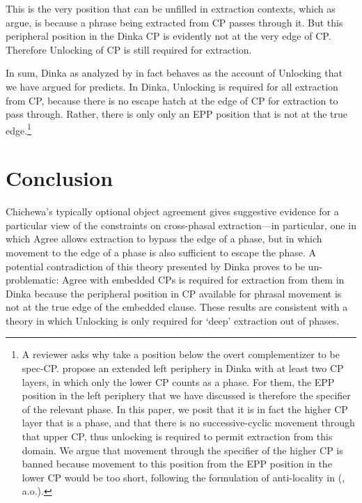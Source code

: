 \documentclass[output=paper,colorlinks,citecolor=brown]{langscibook}
\begin{document}
This is the very position that can be unfilled in extraction contexts, which as \citeauthor{VanUrkRichards2015} argue, is because a phrase being extracted from CP passes through it. But this peripheral position in the Dinka CP is evidently not at the very edge of CP. Therefore Unlocking of CP is still required for extraction.

In sum, Dinka as analyzed by \citeauthor{VanUrkRichards2015} in fact behaves as the account of Unlocking that we have argued for predicts. In Dinka, Unlocking is required for all extraction from CP, because there is no escape hatch at the edge of CP for extraction to pass through. Rather, there is only only an EPP position that is not at the true edge.\footnote{A reviewer asks why \citeauthor{VanUrkRichards2015} take a position below the overt complementizer to be spec-CP. \citeauthor{VanUrkRichards2015} propose an extended left periphery in Dinka with at least two CP layers, in which only the lower CP counts as a phase. For them, the EPP position in the left periphery that we have discussed is therefore the specifier of the relevant phase. In this paper, we posit that it is in fact the higher CP layer that is a phase, and that there is no successive-cyclic movement through that upper CP, thus unlocking is required to permit extraction from this domain. We argue that movement through the specifier of the higher CP is banned because movement to this position from the EPP position in the lower CP would be too short, following the formulation of anti-locality in \citeauthor{Erlewine2016} (\citeyear{Erlewine2016}, a.o.).}

\section{Conclusion}\label{sec:branan:6}

Chichewa's typically optional object agreement gives suggestive evidence for a particular view of the constraints on cross-phasal extraction---in particular, one in which Agree allows extraction to bypass the edge of a phase, but in which movement to the edge of a phase is also sufficient to escape the phase. A potential contradiction of this theory presented by Dinka proves to be un-problematic: Agree with embedded CPs is required for extraction from them in Dinka because the peripheral position in CP available for phrasal movement is not at the true edge of the embedded clause. These results are consistent with a theory in which Unlocking is only required for `deep' extraction out of phases.
\end{document}
